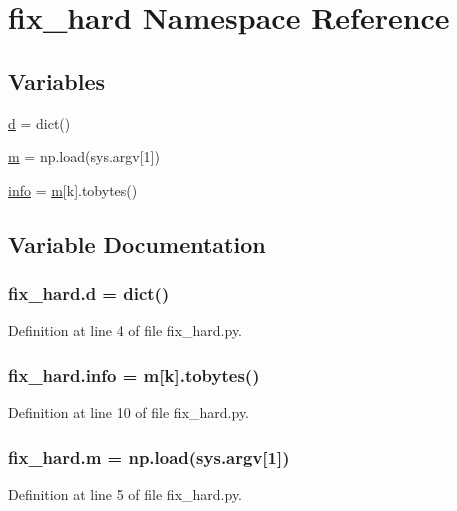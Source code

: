 \hypertarget{namespacefix__hard}{}\section{fix\+\_\+hard Namespace Reference}
\label{namespacefix__hard}
\subsection*{Variables}
\begin{DoxyCompactItemize}
\item 
\hyperlink{namespacefix__hard_aabe341c29efe998cc0ae0776d9e87043}{d} = dict()
\item 
\hyperlink{namespacefix__hard_aeddecc2eb0c9f49a568cb1bf69ac50f5}{m} = np.\+load(sys.\+argv\mbox{[}1\mbox{]})
\item 
\hyperlink{namespacefix__hard_a31eedbb056537bc1bef47ad5e40eaa68}{info} = \hyperlink{namespacefix__hard_aeddecc2eb0c9f49a568cb1bf69ac50f5}{m}\mbox{[}k\mbox{]}.tobytes()
\end{DoxyCompactItemize}


\subsection{Variable Documentation}
\subsubsection[{\texorpdfstring{d}{d}}]{\setlength{\rightskip}{0pt plus 5cm}fix\+\_\+hard.\+d = dict()}\hypertarget{namespacefix__hard_aabe341c29efe998cc0ae0776d9e87043}{}\label{namespacefix__hard_aabe341c29efe998cc0ae0776d9e87043}


Definition at line 4 of file fix\+\_\+hard.\+py.

\subsubsection[{\texorpdfstring{info}{info}}]{\setlength{\rightskip}{0pt plus 5cm}fix\+\_\+hard.\+info = {\bf m}\mbox{[}k\mbox{]}.tobytes()}\hypertarget{namespacefix__hard_a31eedbb056537bc1bef47ad5e40eaa68}{}\label{namespacefix__hard_a31eedbb056537bc1bef47ad5e40eaa68}


Definition at line 10 of file fix\+\_\+hard.\+py.

\subsubsection[{\texorpdfstring{m}{m}}]{\setlength{\rightskip}{0pt plus 5cm}fix\+\_\+hard.\+m = np.\+load(sys.\+argv\mbox{[}1\mbox{]})}\hypertarget{namespacefix__hard_aeddecc2eb0c9f49a568cb1bf69ac50f5}{}\label{namespacefix__hard_aeddecc2eb0c9f49a568cb1bf69ac50f5}


Definition at line 5 of file fix\+\_\+hard.\+py.

